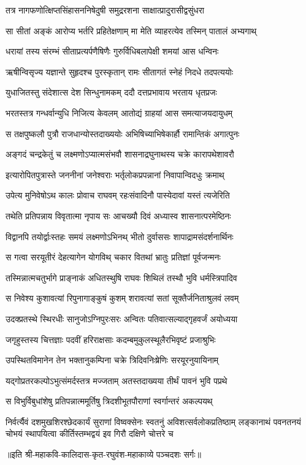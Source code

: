 \twolineshloka
{तत्र नागफणोत्क्षिप्तसिंहासननिषेदुषी}
{समुद्ररशना साक्षात्प्रादुरासीद्वसुंधरा}%

\twolineshloka
{सा सीतां अङ्कं आरोप्य भर्तरि प्रहितेक्षणाम्}
{मा मेति व्याहरत्येव तस्मिन् पातालं अभ्यगाथ्}%

\twolineshloka
{धरायां तस्य संरम्भं सीताप्रत्यर्पणैषिणैः}
{गुरुर्विधिबलापेक्षी शमयां आस धन्विनः}%

\twolineshloka
{ऋषीन्विसृज्य यज्ञान्ते सुहृदश्च पुरस्कृतान्}
{रामः सीतागतं स्नेहं निदधे तदपत्ययोः}%

\twolineshloka
{युधाजितस्तु संदेशात्स देश सिन्धुनामकम्}
{ददौ दत्तप्रभावाय भरताय धृतप्रजः}%

\twolineshloka
{भरतस्तत्र गन्धर्वान्युधि निजित्य केवलम्}
{आतोद्यं ग्राहयां आस समत्याजयदायुधम्}%

\twolineshloka
{स तक्षपुष्कलौ पुत्रौ राजधान्योस्तदाख्ययोः}
{अभिषिच्याभिषेकार्हौ रामान्तिकं अगात्पुनः}%

\twolineshloka
{अङ्गदं चन्द्रकेतुं च लक्ष्मणोऽप्यात्मसंभवौ}
{शासनाद्रघुनाथस्य चक्रे कारापथेशावरौ}%

\twolineshloka
{इत्यारोपितपुत्रास्ते जननीनां जनेश्वराः}
{भर्तृलोकप्रपन्नानां निवापान्विदधुः क्रमाथ्}%

\twolineshloka
{उपेत्य मुनिवेषोऽथ कालः प्रोवाच राघवम्}
{रहःसंवादिनौ पास्येदावां यस्तं त्यजेरिति}%

\twolineshloka
{तथेति प्रतिपन्नाय विवृतात्मा नृपाय सः}
{आचख्यौ दिवं अध्यास्व शासनात्परमेष्ठिनः}%

\twolineshloka
{विद्वानपि तयोर्द्वाःस्तहः समयं लक्ष्मणोऽभिनथ्}
{भीतो दुर्वाससः शापाद्रामसंदर्शनार्थिनः}%

\twolineshloka
{स गत्वा सरयूतीरं देहत्यागेन योगविथ्}
{चकार वितथां भ्रातुः प्रतिज्ञां पूर्वजन्मनः}%

\twolineshloka
{तस्मिन्नात्मचतुर्भागे प्राङ्नाकं अधितस्थुषि}
{राघवः शिथिलं तस्थौ भुवि धर्मस्त्रिपादिव}%

\twolineshloka
{स निवेश्य कुशावत्यां रिपुनागाङ्कुषं कुशम्}
{शरावत्यां सतां सूक्तैर्जनिताश्रुलवं लवम्}%

\twolineshloka
{उदक्प्रतस्थे स्थिरधीः सानुजोऽग्निपुरःसरः}
{अन्वितः पतिवात्सल्याद्गृहवर्जं अयोध्यया}%

\twolineshloka
{जगृहुस्तस्य चित्तज्ञाः पदवीं हरिराक्षसाः}
{कदम्बमुकुलस्थूलैरभिवृष्टं प्रजाश्रुभिः}%

\twolineshloka
{उपस्थितविमानेन तेन भक्तानुकम्पिना}
{चक्रे त्रिदिवनिःष्रेणिः सरयूरनुयायिनाम्}%

\twolineshloka
{यद्गोप्रतरकल्पोऽभुत्संमर्दस्तत्र मज्जताम्}
{अतस्तदाख्यया तीर्थं पावनं भुवि पप्रथे}%

\twolineshloka
{स विभुर्विबुधांशेषु प्रतिपन्नात्ममूर्तिषु}
{त्रिदशीभूतपौराणां स्वर्गान्तरं अकल्पयथ्}%

\twolineshloka
{निर्वर्त्यैवं दशमुखशिरश्छेदकार्यं सुराणां विष्वक्सेनः स्वतनुं अविशत्सर्वलोकप्रतिष्ठाम्}
{लङ्कानाथं पवनतनयं चोभयं स्थापयित्वा कीर्तिस्तम्भद्वयं इव गिरौ दक्षिणे चोत्तरे च}%

॥इति श्री-महाकवि-कालिदास-कृत-रघुवंश-महाकाव्ये पञ्चदशः सर्गः॥